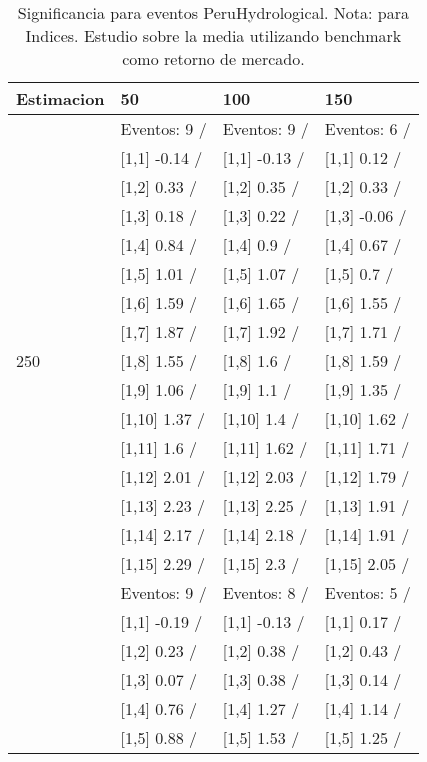 \begin{table}

\caption{Significancia para eventos PeruHydrological. Nota: para Indices. Estudio sobre la media utilizando benchmark como retorno de mercado.}
\centering
\begin{tabular}[t]{llll}
\toprule
Estimacion & 50 & 100 & 150\\
\midrule
 & Eventos:  9 / & Eventos:  9 / & Eventos:  6 /\\
 & {}[1,1] -0.14  / & {}[1,1] -0.13  / & {}[1,1] 0.12  /\\
 & {}[1,2] 0.33  / & {}[1,2] 0.35  / & {}[1,2] 0.33  /\\
 & {}[1,3] 0.18  / & {}[1,3] 0.22  / & {}[1,3] -0.06  /\\
 & {}[1,4] 0.84  / & {}[1,4] 0.9  / & {}[1,4] 0.67  /\\
\addlinespace
 & {}[1,5] 1.01  / & {}[1,5] 1.07  / & {}[1,5] 0.7  /\\
 & {}[1,6] 1.59  / & {}[1,6] 1.65  / & {}[1,6] 1.55  /\\
 & {}[1,7] 1.87  / & {}[1,7] 1.92  / & {}[1,7] 1.71  /\\
250 & {}[1,8] 1.55  / & {}[1,8] 1.6  / & {}[1,8] 1.59  /\\
 & {}[1,9] 1.06  / & {}[1,9] 1.1  / & {}[1,9] 1.35  /\\
\addlinespace
 & {}[1,10] 1.37  / & {}[1,10] 1.4  / & {}[1,10] 1.62  /\\
 & {}[1,11] 1.6  / & {}[1,11] 1.62  / & {}[1,11] 1.71  /\\
 & {}[1,12] 2.01  / & {}[1,12] 2.03  / & {}[1,12] 1.79  /\\
 & {}[1,13] 2.23  / & {}[1,13] 2.25  / & {}[1,13] 1.91  /\\
 & {}[1,14] 2.17  / & {}[1,14] 2.18  / & {}[1,14] 1.91  /\\
\addlinespace
 & {}[1,15] 2.29  / & {}[1,15] 2.3  / & {}[1,15] 2.05  /\\
 & Eventos:  9 / & Eventos:  8 / & Eventos:  5 /\\
 & {}[1,1] -0.19  / & {}[1,1] -0.13  / & {}[1,1] 0.17  /\\
 & {}[1,2] 0.23  / & {}[1,2] 0.38  / & {}[1,2] 0.43  /\\
 & {}[1,3] 0.07  / & {}[1,3] 0.38  / & {}[1,3] 0.14  /\\
\addlinespace
 & {}[1,4] 0.76  / & {}[1,4] 1.27  / & {}[1,4] 1.14  /\\
 & {}[1,5] 0.88  / & {}[1,5] 1.53  / & {}[1,5] 1.25  /\\

\end{tabular}
\end{table}
